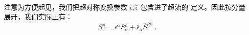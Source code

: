 注意为方便起见，我们把超对称变换参数 $\epsilon,\bar\epsilon$ 包含进了超流的
定义。因此按分量展开，我们实际上有：
\begin{equation}
S^\rho =\epsilon^\alpha S^\rho_\alpha + \bar\epsilon_{\dot\alpha}
\bar S^{\rho\dot\alpha}\,.
\label{S-comp}
\end{equation}
  
